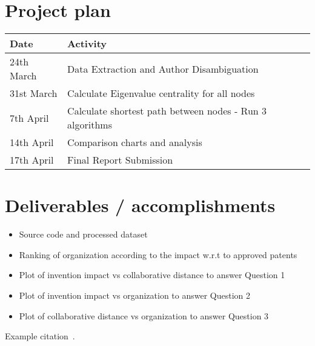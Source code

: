 \documentclass[11pt]{article}
\begin{document}
\section{Project plan}
\begin{table}[h]
\centering
\begin{tabular}{| l | l | }
\hline
{Date} & {Activity} \\
\hline
\hline
24th March & Data Extraction and Author Disambiguation\\
31st March & Calculate Eigenvalue centrality for all nodes\\
7th April & Calculate shortest path between nodes - Run 3 algorithms\\
14th April &  Comparison charts and analysis\\
17th April & Final Report Submission\\
\hline
\end{tabular}
\label{tbl:milestone}
\end{table}

\section{Deliverables / accomplishments }
\begin{itemize}
\item Source code and processed dataset
\item Ranking of organization according to the impact w.r.t to approved patents
\item Plot of invention impact vs collaborative distance to answer Question 1
\item Plot of invention impact vs organization to answer Question 2
\item Plot of collaborative distance vs organization to answer Question 3
\end{itemize}
Example citation~\cite{Hall01thenber}.
{

}
\end{document}
